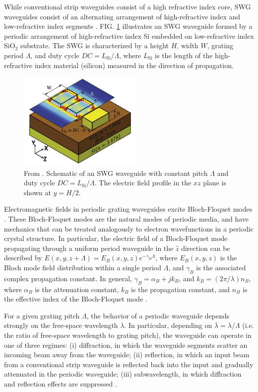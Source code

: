 \documentclass[aps,prl,twocolumn, superscriptaddress,nobalancelastpage]{revtex4}
\begin{document}
While conventional strip waveguides consist of a high refractive index core, SWG waveguides consist of an alternating arrangement of high-refractive index and low-refractive index segments \cite{OGswg}. FIG. \ref{fig:SWGdiagram} illustrates an SWG waveguide formed by a periodic arrangement of high-refractive index Si embedded on low-refractive index SiO$_2$ substrate. The SWG is characterized by a height $H$, width $W$, grating period $\Lambda$, and duty cycle $DC= L_\text{Si}/\Lambda$, where $L_\text{Si}$ is the length of the high-refractive index material (silicon) measured in the direction of propagation. 

\begin{figure}[!ht]
    \centering
    \includegraphics[width=6cm]{swgwaveguide2.png}
    \caption{From \cite{swg1}. Schematic of an SWG waveguide with constant pitch $\Lambda$ and duty cycle $DC = L_\text{Si}/\Lambda$. The electric field profile in the $xz$ plane is shown at $y = H/2$.}
    \label{fig:SWGdiagram}
\end{figure}

Electromagnetic fields in periodic grating waveguides excite Bloch-Floquet modes \cite{PhotonicCrystalsText}. These Bloch-Floquet modes are the natural modes of periodic media, and have mechanics that can be treated analogously to electron wavefunctions in a periodic crystal structure. In particular, the electric field of a Bloch-Floquet mode propagating through a uniform period waveguide in the $\hat{z}$ direction can be described by $E(x,y,z+\Lambda) = E_B(x,y,z)e^{-\gamma_B\Lambda}$, where $E_B(x,y,z)$ is the Bloch mode field distribution within a single period $\Lambda$, and $\gamma_B$ is the associated complex propagation constant. In general, $\gamma_B = \alpha_B + jk_B$, and $k_B = (2\pi/\lambda)n_B$, where $\alpha_B$ is the attenuation constant, $k_B$ is the propagation constant, and $n_B$ is the effective index of the Bloch-Floquet mode \cite{HalirReview}. 


For a given grating pitch $\Lambda$, the behavior of a periodic waveguide depends strongly on the free-space wavelength $\lambda$. In particular, depending on $\overline{\lambda} = \lambda/\Lambda$ (i.e. the ratio of free-space wavelength to grating pitch), the waveguide can operate in one of three regimes: (i) diffraction, in which the waveguide segments scatter an incoming beam away from the waveguide; (ii) reflection, in which an input beam from a conventional strip waveguide is reflected back into the input and gradually attenuated in the periodic waveguide; (iii) subwavelength, in which diffraction and reflection effects are suppressed \cite{HalirReview}. 
\end{document}
